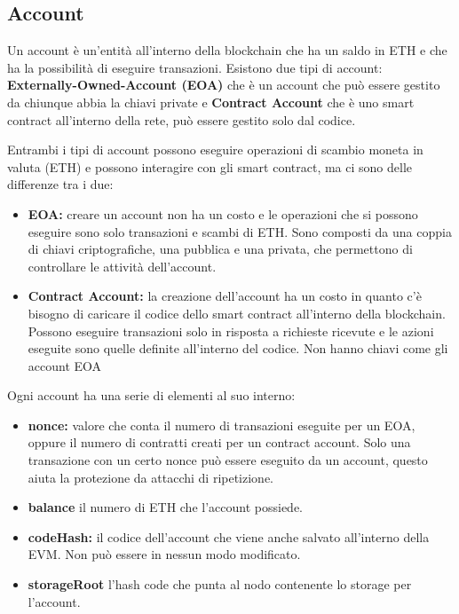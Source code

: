 \subsection{Account}
Un account è un'entità all'interno della blockchain che ha un saldo in ETH e
che ha la possibilità di eseguire transazioni. Esistono due tipi di account:
\textbf{Externally-Owned-Account (EOA)} che è un account che può essere gestito
da chiunque abbia la chiavi private e \textbf{Contract Account} che è uno smart
contract all'interno della rete, può essere gestito solo dal codice.

Entrambi i tipi di account possono eseguire operazioni di scambio moneta 
in valuta (ETH) e possono interagire con gli smart contract, ma ci sono delle 
differenze tra i due:

\begin{itemize}
    \item \textbf{EOA:} creare un account non ha un costo e le operazioni che 
        si possono eseguire sono solo transazioni e scambi di ETH. Sono 
        composti da una coppia di chiavi criptografiche, una 
        pubblica e una privata, che permettono di controllare le attività
        dell'account.
    \item \textbf{Contract Account:} la creazione dell'account ha un costo
        in quanto c'è bisogno di caricare il codice dello smart contract
        all'interno della blockchain. Possono eseguire transazioni solo in 
        risposta a richieste ricevute e le azioni eseguite sono quelle definite
        all'interno del codice. Non hanno chiavi come gli account EOA
\end{itemize}

\newpage

Ogni account ha una serie di elementi al suo interno:
\begin{itemize}
    \item \textbf{nonce:} valore che conta il numero di transazioni eseguite
        per un EOA, oppure il numero di contratti creati per un contract
        account. Solo una transazione con un certo nonce può essere eseguito
        da un account, questo aiuta la protezione da attacchi di ripetizione.
    \item \textbf{balance} il numero di ETH che l'account possiede.
    \item \textbf{codeHash:} il codice dell'account che viene anche salvato 
        all'interno della EVM. Non può essere in nessun modo modificato.
    \item \textbf{storageRoot} l'hash code che punta al nodo contenente lo 
        storage per l'account.
\end{itemize}

